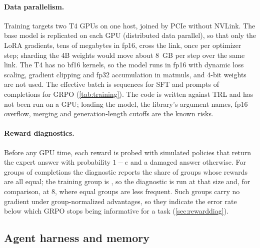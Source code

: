 \paragraph{Data parallelism.}
Training targets two T4 GPUs on one host, joined by PCIe without NVLink. The base model is replicated on each GPU (distributed data parallel), so that only the LoRA gradients, tens of megabytes in fp16, cross the link, once per optimizer step; sharding the 4B weights would move about 8~GB per step over the same link.
The T4 has no bf16 kernels, so the model runs in fp16 with dynamic loss scaling, gradient clipping and fp32 accumulation in matmuls, and 4-bit weights are not used. The effective batch is  sequences for SFT and  prompts of  completions for GRPO (\cref{tab:training}).
The code is written against TRL \citep{vonwerra2020trl} and has not been run on a GPU; loading the model, the library's argument names, fp16 overflow, merging and generation-length cutoffs are the known risks.

\begin{table}[tbp]
\centering

\caption{Training settings, read from \texttt{train/config.py} (ranks from the dual-T4 recipe of the repository). None of this has been run on a GPU.}
\label{tab:training}
\end{table}

\paragraph{Reward diagnostics.}
Before any GPU time, each reward is probed with simulated policies that return the expert answer with probability $1-e$ and a damaged answer otherwise. For groups of
 completions the diagnostic reports the share of groups whose rewards are all equal; the training group is , so the diagnostic is run at that size and, for comparison, at 8, where equal groups are less frequent. Such groups carry no gradient under group-normalized advantages, so they indicate the error rate below
which GRPO stops being informative for a task (\cref{sec:rewarddiag}).

\subsection{Agent harness and memory}\label{sec:harness}

